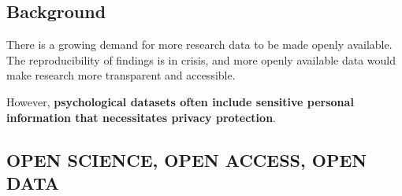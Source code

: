 \documentclass[a0,portrait]{a0poster}
\begin{document}
\vspace{1cm}

\begin{multicols}{3} %

\normalsize
\section{Background}

There is a growing demand for more research data to be made openly available.
The reproducibility of findings is in crisis, and more openly available data would make research more transparent and accessible.

However, \textbf{psychological datasets often include sensitive %
personal information that necessitates privacy protection}.

\subsection{OPEN SCIENCE, OPEN ACCESS, OPEN DATA}


\end{multicols}
\end{document}
